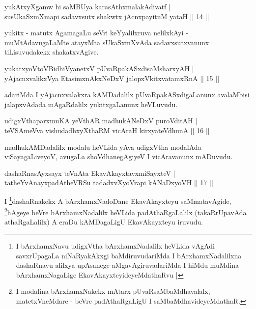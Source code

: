 \begin{shl}
yukAtxyXgamw hi saMBUya karasAthxmalakAdivatf |\\
susUkaSxmXmapi sadavxsutx shakwtx jAcnxpayituM yataH \hfill || 14 ||
\end{shl}

\begin{artha}
yukitx - matutx AgamagaLu seVri keYyalilxruva nelilxkAyi - muMtAdavugaLaMte atayxMta sUkaSxmXvAda sadavxsutxvanunx tiLisuvudakekx shakatxvAgive.
\end{artha}

\begin{shl}
yukatxyoV\s toV\s BidhiVyanetxV pUvaRpakASxdisaMsharxyAH |\\
yAjacnxvalikxVya EtasimxnAkxNeDxV jalopxVkitxvatamxRnA \hfill || 15 ||
\end{shl}

\begin{artha}
adariMda I yAjacnxvalakxra kAMDadalilx pUvaRpakASxdigaLanunx avalaMbisi jalapxvAdada mAgaRdalilx yukitxgaLanunx heVLuvudu.	
\end{artha}


\begin{shl}
udigxVthaparxmuKA yeV\s thAR madhukANeDxV puroVditAH |\\
teVSAmeVva vishudadhxyXthaRM vicAraH kirxyateV\s dhunA \hfill || 16 ||
\end{shl}

\begin{artha}
madhukAMDadalilx modalu heVLida yAva udigxVtha modalAda viSayagaLiveyoV, avugaLa shoVdhanegAgiyeV I vicAravanunx mADuvudu.
\end{artha}

\begin{shl}
dashaRnasAyxsayx teVnAta EkavAkayxtavxmiSayxteV |\\
tatheYvAnayxpadAtheVRSu tadadxvXyoVrapi kANaDxyoVH \hfill || 17 ||
\end{shl}

\begin{artha}
I \footnote{I bArxhamxNavu udigxVtha bArxhamxNadalilx heVLida vAgAdi savxrUpagaLa niNaRyakAkxgi baMdiruvudariMda I bArxhamxNadalilxna dashaRnavu alilxya upAsanege aMgavAgiruvadariMda I hiMdu muMdina bArxhamxNagaLige EkavAkayxteyideyeMdathaRvu |}dashaRnakekx A bArxhamxNadoDane EkavAkayxteyu saMmatavAgide, \footnote{I modalina bArxhamxNakekx mAtarx pUvaRsaMbaMdhavalalx, matetxVneMdare - beVre padAthaRgaLigU I saMbaMdhavideyeMdathaR.}hAgeye beVre bArxhamxNadalilx heVLida padAthaRgaLalilx (takaRrUpavAda athaRgaLalilx) A eraDu kAMDagaLigU EkavAkayxteyu iruvudu.
\end{artha}

